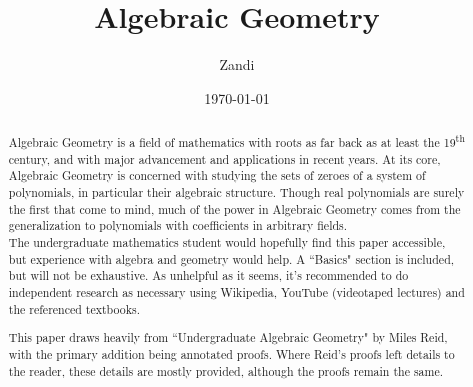 \documentclass[draft]{article}
\begin{document}
\title{Algebraic Geometry}
\author{Zandi} %
\date{\today}
\maketitle

\begin{abstract}
Algebraic Geometry is a field of mathematics with roots as far back as
at least the 19\textsuperscript{th} century, and with major advancement and applications
in recent years. At its core, Algebraic Geometry is concerned with 
studying the sets of zeroes of a system of polynomials, in particular 
their algebraic structure. Though real polynomials are surely the first
that come to mind, much of the power in Algebraic Geometry comes from the
generalization to polynomials with coefficients in arbitrary fields.\\

The undergraduate mathematics student would hopefully find this paper accessible,
but experience with algebra and geometry would help. A ``Basics" section is included,
but will not be exhaustive. As unhelpful as it seems, it's recommended to 
do independent research as necessary using Wikipedia, YouTube (videotaped lectures)
and the referenced textbooks.

This paper draws heavily from ``Undergraduate Algebraic Geometry" by Miles Reid, 
with the primary addition being annotated proofs. Where Reid's proofs
left details to the reader, these details are mostly provided, although
the proofs remain the same.
\end{abstract}








\end{document}
